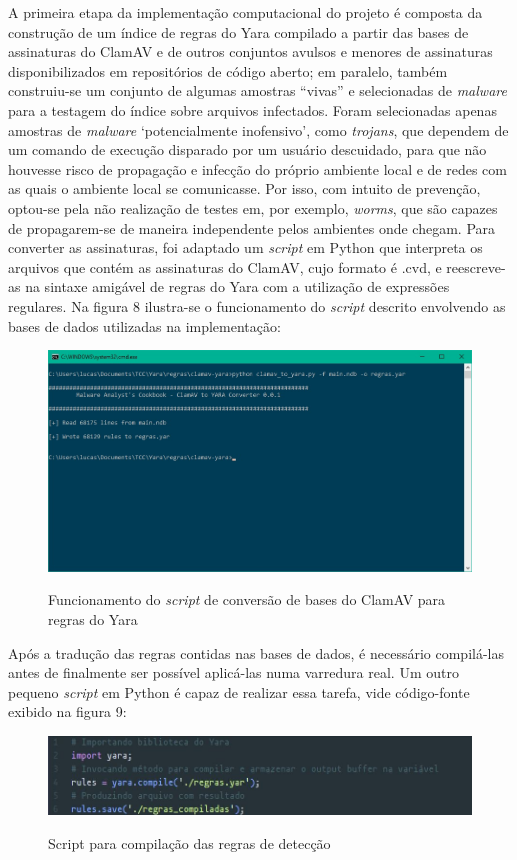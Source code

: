 A primeira etapa da implementação computacional do projeto é composta da
construção de um índice de regras do Yara compilado a partir das bases de
assinaturas do ClamAV e de outros conjuntos avulsos e menores de assinaturas
disponibilizados em repositórios de código aberto; em paralelo, também
construiu-se um conjunto de algumas amostras ``vivas'' e selecionadas de
\textit{malware} para a testagem do índice sobre arquivos infectados. Foram
selecionadas apenas amostras de \textit{malware} `potencialmente inofensivo',
como \textit{trojans}, que dependem de um comando de execução disparado por um
usuário descuidado, para que não houvesse risco de propagação e infecção do
próprio ambiente local e de redes com as quais o ambiente local se comunicasse.
Por isso, com intuito de prevenção, optou-se pela não realização de testes em,
por exemplo, \textit{worms}, que são capazes de propagarem-se de maneira
independente pelos ambientes onde chegam. Para converter as assinaturas, foi
adaptado um \textit{script} em Python que interpreta os arquivos que contém
as assinaturas do ClamAV, cujo formato é .cvd, e reescreve-as na sintaxe
amigável de regras do Yara com a utilização de expressões regulares. Na figura
8 ilustra-se o funcionamento do \textit{script} descrito envolvendo as
bases de dados utilizadas na implementação:
\begin{figure}[H]
  \caption{Funcionamento do \textit{script} de conversão de bases do ClamAV para regras do Yara}
  \includegraphics[scale=0.6]{figs/regras_convertidas}
  \centering
  \label{f.regras_convertidas}
\end{figure}

Após a tradução das regras contidas nas bases de dados, é necessário compilá-las
antes de finalmente ser possível aplicá-las numa varredura real. Um outro
pequeno \textit{script} em Python é capaz de realizar essa tarefa, vide
código-fonte exibido na figura 9:
\begin{figure}[H]
  \caption{Script para compilação das regras de detecção}
  \includegraphics[scale=0.6]{figs/script_conversao}
  \centering
  \label{f.script_comp}
\end{figure}

